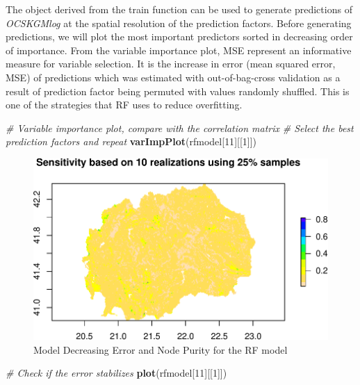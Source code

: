 \documentclass[10pt,b5paper,]{book}
\newenvironment{Shaded}{\begin{snugshade}}{\end{snugshade}}
\newcommand{\CommentTok}[1]{\textcolor[rgb]{0.56,0.35,0.01}{\textit{#1}}}
\newcommand{\DecValTok}[1]{\textcolor[rgb]{0.00,0.00,0.81}{#1}}
\newcommand{\KeywordTok}[1]{\textcolor[rgb]{0.13,0.29,0.53}{\textbf{#1}}}
\newcommand{\NormalTok}[1]{#1}
\theoremstyle{definition}
\theoremstyle{definition}
\theoremstyle{definition}
\theoremstyle{remark}
\begin{document}
The object derived from the train function can be used to generate
predictions of \emph{OCSKGMlog} at the spatial resolution of the
prediction factors. Before generating predictions, we will plot the most
important predictors sorted in decreasing order of importance. From the
variable importance plot, MSE represent an informative measure for
variable selection. It is the increase in error (mean squared error,
MSE) of predictions which was estimated with out-of-bag-cross validation
as a result of prediction factor being permuted with values randomly
shuffled. This is one of the strategies that RF uses to reduce
overfitting.

\begin{Shaded}
\begin{Highlighting}[]
\CommentTok{# Variable importance plot, compare with the correlation matrix}
\CommentTok{# Select the best prediction factors and repeat  }
\KeywordTok{varImpPlot}\NormalTok{(rfmodel[}\DecValTok{11}\NormalTok{][[}\DecValTok{1}\NormalTok{]])}
\end{Highlighting}
\end{Shaded}

\begin{figure}
\centering
\includegraphics{SOCMapping_files/figure-latex/unnamed-chunk-62-1.pdf}
\caption{\label{fig:unnamed-chunk-62}Model Decreasing Error and Node Purity
for the RF model}
\end{figure}

\begin{Shaded}
\begin{Highlighting}[]
\CommentTok{# Check if the error stabilizes }
\KeywordTok{plot}\NormalTok{(rfmodel[}\DecValTok{11}\NormalTok{][[}\DecValTok{1}\NormalTok{]])}
\end{Highlighting}
\end{Shaded}
\end{document}
